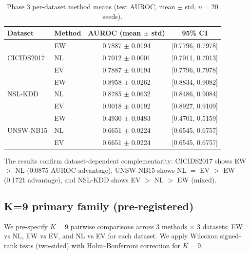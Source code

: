 \begin{table}[h]
\centering
\caption{Phase 3 per-dataset method means (test AUROC, mean $\pm$ std, $n=20$ seeds).}
\label{tab:phase3_means}
\begin{tabular}{llcc}
\toprule
Dataset & Method & AUROC (mean $\pm$ std) & 95\% CI \\
\midrule
\multirow{3}{*}{CICIDS2017}
 & EW  & 0.7887 $\pm$ 0.0194 & [0.7796, 0.7978] \\
 & NL  & 0.7012 $\pm$ 0.0001 & [0.7011, 0.7013] \\
 & EV  & 0.7887 $\pm$ 0.0194 & [0.7796, 0.7978] \\
\midrule
\multirow{3}{*}{NSL-KDD}
 & EW  & 0.8958 $\pm$ 0.0262 & [0.8834, 0.9082] \\
 & NL  & 0.8785 $\pm$ 0.0632 & [0.8486, 0.9084] \\
 & EV  & 0.9018 $\pm$ 0.0192 & [0.8927, 0.9109] \\
\midrule
\multirow{3}{*}{UNSW-NB15}
 & EW  & 0.4930 $\pm$ 0.0483 & [0.4701, 0.5159] \\
 & NL  & 0.6651 $\pm$ 0.0224 & [0.6545, 0.6757] \\
 & EV  & 0.6651 $\pm$ 0.0224 & [0.6545, 0.6757] \\
\bottomrule
\end{tabular}
\end{table}

The results confirm dataset-dependent complementarity: CICIDS2017 shows EW $>$ NL (0.0875 AUROC advantage), UNSW-NB15 shows NL $=$ EV $>$ EW (0.1721 advantage), and NSL-KDD shows EV $>$ NL $>$ EW (mixed).

\subsection{K=9 primary family (pre-registered)}

We pre-specify $K=9$ pairwise comparisons across 3 methods $\times$ 3 datasets: EW vs NL, EW vs EV, and NL vs EV for each dataset. We apply Wilcoxon signed-rank tests (two-sided) with Holm--Bonferroni correction for $K=9$.

